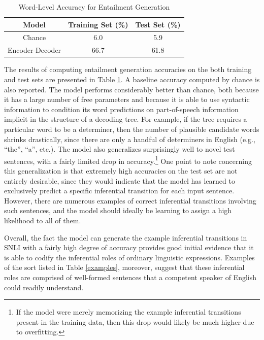 \begin{table}[!t]
\begin{center} 
\caption{Word-Level Accuracy for Entailment Generation} 
\label{accuracy} 
\vskip 0.12in
\begin{tabular}{c c c} 
\hline
Model  &  Training Set (\%)  & Test Set (\%)\\
\hline
\rule{0pt}{3ex}Chance  &  6.0 &  5.9 \\
Encoder-Decoder  &  66.7 & 61.8  \\
\hline
\end{tabular} 
\end{center} 
\end{table}

The results of computing entailment generation accuracies on the both training and test sets are presented in Table \ref{accuracy}. A baseline accuracy computed by chance is also reported. The model performs considerably better than chance, both because it has a large number of free parameters and because it is able to use syntactic information to condition its word predictions on part-of-speech information implicit in the structure of a decoding tree. For example, if the tree requires a particular word to be a determiner, then the number of plausible candidate words shrinks drastically, since there are only a handful of determiners in English (e.g., ``the'', ``a'', etc.). The model also generalizes surprisingly well to novel test sentences, with a fairly limited drop in accuracy.\footnote{If the model were merely memorizing the example inferential transitions present in the training data, then this drop would likely be much higher due to overfitting.} One point to note concerning this generalization is that extremely high accuracies on the test set are not entirely desirable, since they would indicate that the model has learned to exclusively predict a specific inferential transition for each input sentence. However, there are numerous examples of correct inferential transitions involving such sentences, and the model should ideally be learning to assign a high likelihood to all of them.  

Overall, the fact the model can generate the example inferential transitions in SNLI with a fairly high degree of accuracy provides good initial evidence that it is able to codify the inferential roles of ordinary linguistic expressions. Examples of the sort listed in Table \ref{examples}, moreover, suggest that these inferential roles are comprised of well-formed sentences that a competent speaker of English could readily understand. 

